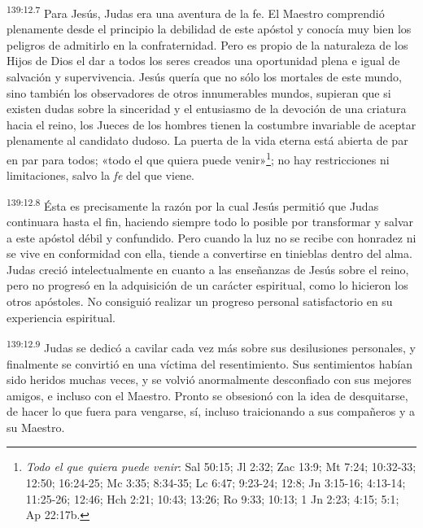 \par 
\textsuperscript{139:12.7} Para Jesús, Judas era una aventura de la fe. El Maestro comprendió plenamente desde el principio la debilidad de este apóstol y conocía muy bien los peligros de admitirlo en la confraternidad. Pero es propio de la naturaleza de los Hijos de Dios el dar a todos los seres creados una oportunidad plena e igual de salvación y supervivencia. Jesús quería que no sólo los mortales de este mundo, sino también los observadores de otros innumerables mundos, supieran que si existen dudas sobre la sinceridad y el entusiasmo de la devoción de una criatura hacia el reino, los Jueces de los hombres tienen la costumbre invariable de aceptar plenamente al candidato dudoso. La puerta de la vida eterna está abierta de par en par para todos; «todo el que quiera puede venir»\footnote{\textit{Todo el que quiera puede venir}: Sal 50:15; Jl 2:32; Zac 13:9; Mt 7:24; 10:32-33; 12:50; 16:24-25; Mc 3:35; 8:34-35; Lc 6:47; 9:23-24; 12:8; Jn 3:15-16; 4:13-14; 11:25-26; 12:46; Hch 2:21; 10:43; 13:26; Ro 9:33; 10:13; 1 Jn 2:23; 4:15; 5:1; Ap 22:17b.}; no hay restricciones ni limitaciones, salvo la \textit{fe} del que viene.

\par 
\textsuperscript{139:12.8} Ésta es precisamente la razón por la cual Jesús permitió que Judas continuara hasta el fin, haciendo siempre todo lo posible por transformar y salvar a este apóstol débil y confundido. Pero cuando la luz no se recibe con honradez ni se vive en conformidad con ella, tiende a convertirse en tinieblas dentro del alma. Judas creció intelectualmente en cuanto a las enseñanzas de Jesús sobre el reino, pero no progresó en la adquisición de un carácter espiritual, como lo hicieron los otros apóstoles. No consiguió realizar un progreso personal satisfactorio en su experiencia espiritual.

\par 
\textsuperscript{139:12.9} Judas se dedicó a cavilar cada vez más sobre sus desilusiones personales, y finalmente se convirtió en una víctima del resentimiento. Sus sentimientos habían sido heridos muchas veces, y se volvió anormalmente desconfiado con sus mejores amigos, e incluso con el Maestro. Pronto se obsesionó con la idea de desquitarse, de hacer lo que fuera para vengarse, sí, incluso traicionando a sus compañeros y a su Maestro.


